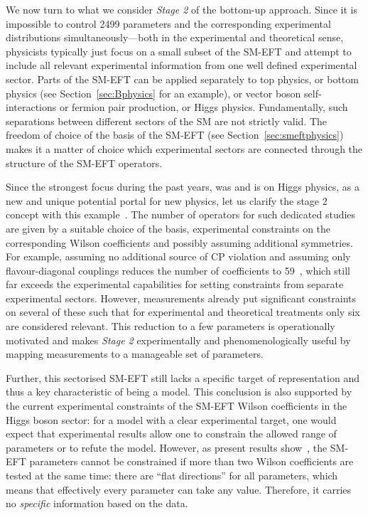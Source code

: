 We now turn to what we consider \emph{Stage 2} of the bottom-up approach.
Since it is impossible to control
2499 parameters and the corresponding experimental distributions
simultaneously---both in the experimental and theoretical
sense, physicists typically just focus on a small subset of the SM-EFT and attempt to
include all relevant experimental information from one well defined
experimental sector. 
Parts of the SM-EFT can be applied separately to top physics, or bottom
physics (see Section~\ref{sec:Bphysics} for an example), or vector boson
self-interactions or fermion pair production, or Higgs physics. 
Fundamentally, such separations between different sectors of the SM
are not strictly valid. The freedom of choice of the basis of the
SM-EFT (see Section~\ref{sec:smeftphysics}) makes it a matter of
choice which experimental sectors are connected through the structure
of the SM-EFT operators.

Since the strongest focus during the past years, was and is on Higgs physics, as a new
and unique potential portal for new physics, let us clarify the stage 2 concept with
this example~\citep{Espinosa:2016ovf}.
The number of operators for such dedicated studies are given by a suitable choice
of the basis, experimental constraints on the corresponding Wilson coefficients and
possibly assuming additional symmetries.
For example, assuming no additional source of CP violation and assuming
only flavour-diagonal couplings reduces the number of coefficients to
59~\citep{Buchmuller:1985jz,Grzadkowski:2010es}, 
which still far exceeds the experimental capabilities for setting
constraints from separate experimental sectors. 
However, measurements already put significant constraints on several of these such that for experimental and theoretical treatments only six are considered relevant.
This reduction to a few parameters is operationally motivated and makes \emph{Stage 2} experimentally and
phenomenologically useful by mapping measurements to a manageable set
of parameters. 

Further, this sectorised SM-EFT still lacks a specific target of representation and thus a key characteristic of being a model. 
This conclusion is also
supported by the current experimental constraints of the SM-EFT Wilson
coefficients in the Higgs boson sector: for a model with a clear
experimental target, one would expect that experimental results allow one
to constrain the allowed range of parameters or to refute the
model. However, as present results show~\citep{ATL-PHYS-PUB-2019-042},
the SM-EFT parameters cannot be constrained if more than two Wilson
coefficients are tested at the same time: there are ``flat
directions'' for all parameters, which means that effectively every
parameter can take any value. Therefore, it carries no
\emph{specific} information based on the data.

